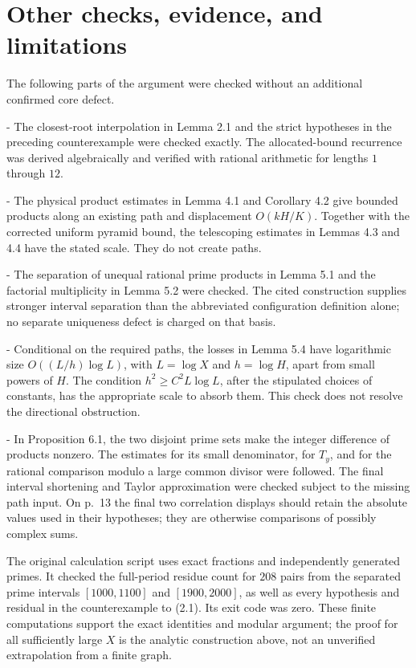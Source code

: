\documentclass[10pt]{article}
\begin{document}
\section*{Other checks, evidence, and limitations}
The following parts of the argument were checked without an additional confirmed core defect.\par
- The closest-root interpolation in Lemma 2.1 and the strict hypotheses in the preceding counterexample were checked exactly. The allocated-bound recurrence was derived algebraically and verified with rational arithmetic for lengths \(1\) through \(12\).\par
- The physical product estimates in Lemma 4.1 and Corollary 4.2 give bounded products along an existing path and displacement \(O(kH/K)\). Together with the corrected uniform pyramid bound, the telescoping estimates in Lemmas 4.3 and 4.4 have the stated scale. They do not create paths.\par
- The separation of unequal rational prime products in Lemma 5.1 and the factorial multiplicity in Lemma 5.2 were checked. The cited construction supplies stronger interval separation than the abbreviated configuration definition alone; no separate uniqueness defect is charged on that basis.\par
- Conditional on the required paths, the losses in Lemma 5.4 have logarithmic size \(O((L/h)\log L)\), with \(L=\log X\) and \(h=\log H\), apart from small powers of \(H\). The condition \(h^2\ge C^2L\log L\), after the stipulated choices of constants, has the appropriate scale to absorb them. This check does not resolve the directional obstruction.\par
- In Proposition 6.1, the two disjoint prime sets make the integer difference of products nonzero. The estimates for its small denominator, for \(T_y\), and for the rational comparison modulo a large common divisor were followed. The final interval shortening and Taylor approximation were checked subject to the missing path input. On p. 13 the final two correlation displays should retain the absolute values used in their hypotheses; they are otherwise comparisons of possibly complex sums.\par
The original calculation script uses exact fractions and independently generated primes. It checked the full-period residue count for \(208\) pairs from the separated prime intervals \([1000,1100]\) and \([1900,2000]\), as well as every hypothesis and residual in the counterexample to (2.1). Its exit code was zero. These finite computations support the exact identities and modular argument; the proof for all sufficiently large \(X\) is the analytic construction above, not an unverified extrapolation from a finite graph.\par
\end{document}
